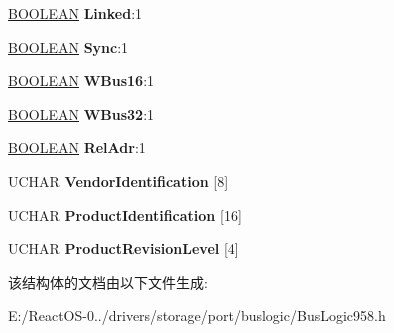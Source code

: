 \begin{DoxyCompactItemize}
\hyperlink{_processor_bind_8h_a112e3146cb38b6ee95e64d85842e380a}{B\+O\+O\+L\+E\+AN} {\bfseries Linked}\+:1
\item 
\mbox{\label{struct_s_c_s_i___inquiry_a49048c02a1ab24d72833b7a8ef7add09}} 
\hyperlink{_processor_bind_8h_a112e3146cb38b6ee95e64d85842e380a}{B\+O\+O\+L\+E\+AN} {\bfseries Sync}\+:1
\item 
\mbox{\label{struct_s_c_s_i___inquiry_ae26665a16b10b208bb4d3d9ba839e2c8}} 
\hyperlink{_processor_bind_8h_a112e3146cb38b6ee95e64d85842e380a}{B\+O\+O\+L\+E\+AN} {\bfseries W\+Bus16}\+:1
\item 
\mbox{\label{struct_s_c_s_i___inquiry_a007e5ed70952b4ffea9782b5f91722c2}} 
\hyperlink{_processor_bind_8h_a112e3146cb38b6ee95e64d85842e380a}{B\+O\+O\+L\+E\+AN} {\bfseries W\+Bus32}\+:1
\item 
\mbox{\label{struct_s_c_s_i___inquiry_a69de620736d960e015d173c87ec884e7}} 
\hyperlink{_processor_bind_8h_a112e3146cb38b6ee95e64d85842e380a}{B\+O\+O\+L\+E\+AN} {\bfseries Rel\+Adr}\+:1
\item 
\mbox{\label{struct_s_c_s_i___inquiry_ad219aa86c17add46286ab8ab432896d8}} 
U\+C\+H\+AR {\bfseries Vendor\+Identification} \mbox{[}8\mbox{]}
\item 
\mbox{\label{struct_s_c_s_i___inquiry_a41a44be308ac77cc8775383c1628429c}} 
U\+C\+H\+AR {\bfseries Product\+Identification} \mbox{[}16\mbox{]}
\item 
\mbox{\label{struct_s_c_s_i___inquiry_aa3f953e28dead3476b2c1561c618706f}} 
U\+C\+H\+AR {\bfseries Product\+Revision\+Level} \mbox{[}4\mbox{]}
\end{DoxyCompactItemize}


该结构体的文档由以下文件生成\+:\begin{DoxyCompactItemize}
\item 
E\+:/\+React\+O\+S-\/0../drivers/storage/port/buslogic/Bus\+Logic958.\+h\end{DoxyCompactItemize}
